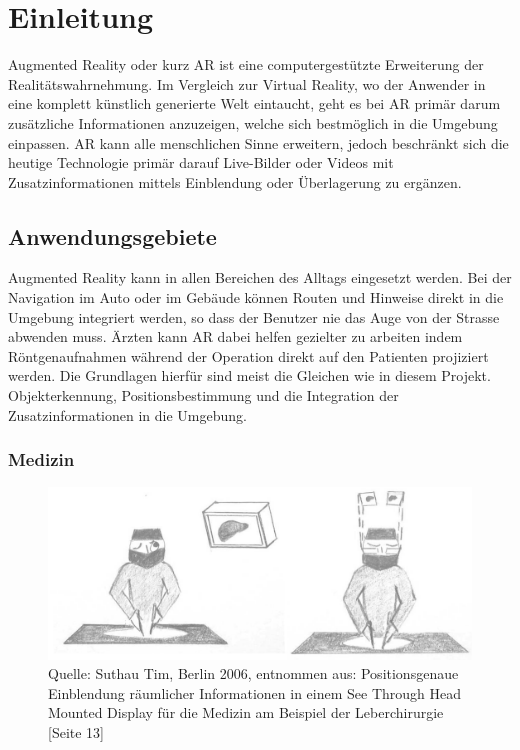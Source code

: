\chapter{Einleitung}

Augmented Reality oder kurz AR ist eine computergestützte Erweiterung der Realitätswahrnehmung. Im Vergleich zur Virtual Reality, wo der Anwender in eine komplett künstlich generierte Welt eintaucht, geht es bei AR primär darum zusätzliche Informationen anzuzeigen, welche sich bestmöglich in die Umgebung einpassen. AR kann alle menschlichen Sinne erweitern, jedoch beschränkt sich die heutige Technologie primär darauf Live-Bilder oder Videos mit Zusatzinformationen mittels Einblendung oder Überlagerung zu ergänzen.

\section{Anwendungsgebiete}

Augmented Reality kann in allen Bereichen des Alltags eingesetzt werden. Bei der Navigation im Auto oder im Gebäude können Routen und Hinweise direkt in die Umgebung integriert werden, so dass der Benutzer nie das Auge von der Strasse abwenden muss. Ärzten kann AR dabei helfen gezielter zu arbeiten indem Röntgenaufnahmen während der Operation direkt auf den Patienten projiziert werden. Die Grundlagen hierfür sind meist die Gleichen wie in diesem Projekt. Objekterkennung, Positionsbestimmung und die Integration der Zusatzinformationen in die Umgebung.

\subsection{Medizin}

\begin{figure}[!ht]
\centering
\includegraphics[scale=0.3]{images/vorteile_augmented_reality_medizin} 
\caption{Quelle: Suthau Tim, Berlin 2006, entnommen aus: Positionsgenaue Einblendung räumlicher Informationen in einem See Through Head Mounted Display für die Medizin am Beispiel der Leberchirurgie [Seite 13]}
\label{fig:ar-medicine}
\end{figure}

